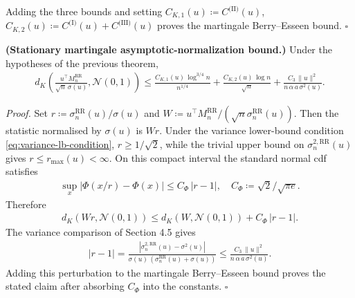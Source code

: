 Adding the three bounds and setting
\(C_{K, 1}(u) \coloneqq C^{\text{(II)}}(u)\), \(C_{K, 2}(u) \coloneqq C^{\text{(I)}}(u) + C^{\text{(III)}}(u)\)
proves the martingale Berry--Esseen bound. \(\square\)

\begin{corollary}\label{cor:M-RR-BE-sigma}
  \textbf{(Stationary martingale asymptotic-normalization bound.)}
  Under the hypotheses of the previous theorem,
\begin{equation}
\begin{aligned}
  d_K \left(
    \frac{u^\top M_n^{\text{RR}}}{\sqrt{n} \, \sigma(u)},
    \mathcal{N}(0, 1)
  \right)
    \le \frac{C_{K, 1}(u) \, \log^{3 / 4} n}{n^{1 / 4}}
     + \frac{C_{K, 2}(u) \, \log n}{\sqrt{n}}
     + \frac{C_3 \, \lVert  u  \rVert^2}{n \, \alpha \, a \, \sigma^2(u)}.
\end{aligned}
\label{eq:M-RR-BE-sigma}
\end{equation}
\end{corollary}

\textit{Proof.} Set \(r \coloneqq \sigma_n^{\text{RR}}(u) / \sigma(u)\) and
\(W \coloneqq u^\top M_n^{\text{RR}} / (\sqrt{n} \sigma_n^{\text{RR}}(u))\). Then the statistic
normalised by \(\sigma(u)\) is \(W r\). Under the variance lower-bound condition \eqref{eq:variance-lb-condition},
\(r \ge 1 / \sqrt{2}\), while the trivial upper bound on
\(\sigma_n^{2, \text{RR}}(u)\) gives \(r \le r_{\max}(u) < \infty\). On this compact
interval the standard normal cdf satisfies
\begin{equation}
\begin{aligned}
\sup_x |\Phi(x / r) - \Phi(x)| \le C_\Phi \, |r - 1|,
\quad
C_\Phi \coloneqq \sqrt{2} / \sqrt{\pi e}.
\end{aligned}
\end{equation}
Therefore
\begin{equation}
\begin{aligned}
d_K \left(W r, \mathcal{N}(0, 1)\right)
  \le d_K \left(W, \mathcal{N}(0, 1)\right) + C_\Phi \, |r - 1|.
\end{aligned}
\end{equation}
The variance comparison of Section 4.5 gives
\begin{equation}
\begin{aligned}
|r - 1|
  = \frac{|\sigma_n^{2, \text{RR}}(u) - \sigma^2(u)|}{\sigma(u) \, (\sigma_n^{\text{RR}}(u) + \sigma(u))}
  \le \frac{C_3 \, \lVert  u  \rVert^2}{n \, \alpha \, a \, \sigma^2(u)}.
\end{aligned}
\end{equation}
Adding this perturbation to the martingale Berry--Esseen bound proves the
stated claim after absorbing \(C_\Phi\) into the constants. \(\square\)

